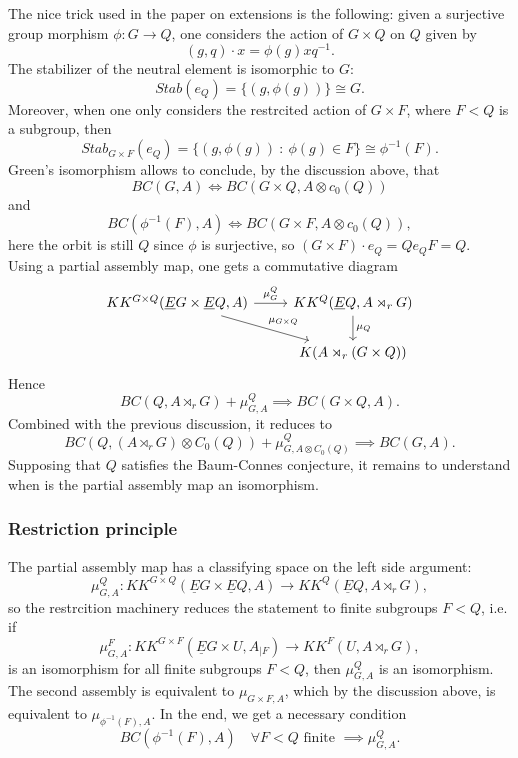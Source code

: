 The nice trick used in the paper on extensions is the following: given a surjective group morphism $\phi: G \rightarrow Q$, one considers the action of $G\times Q$ on $Q$ given by 
\[(g,q)\cdot x  =  \phi(g)xq^{-1}.\]
The stabilizer of the neutral element is isomorphic to $G$:
\[Stab(e_Q) = \{ (g,\phi(g)) \}\cong G .\]
Moreover, when one only considers the restrcited action of $G\times F$, where $F<Q$ is a subgroup, then
\[Stab_{G\times F}(e_Q) =\{ (g,\phi(g))\ : \ \phi(g)\in F \}\cong \phi^{-1}(F).\]
Green's isomorphism allows to conclude, by the discussion above, that 
\[BC(G,A) \iff BC(G\times Q , A\otimes c_0(Q))\]
and 
\[BC(\phi^{-1}(F),A) \iff BC(G\times F , A\otimes c_0(Q)),\]
here the orbit is still $Q$ since $\phi$ is surjective, so $(G\times F)\cdot e_Q = Qe_Q F=Q$.\\

Using a partial assembly map, one gets a  commutative diagram
\[\begin{tikzcd}
KK^{G\times Q}(\underline E G \times \underline E Q, A) \arrow{rd}{\mu_{G\times Q}}\arrow{r}{\mu_G^Q} & KK^Q(\underline E Q , A\rtimes_r G) \arrow{d}{\mu_Q} \\
		& K(A\rtimes_r (G\times Q) )
\end{tikzcd}\]
Hence 
\[BC(Q, A\rtimes_r G) + \mu_{G,A}^Q \implies BC(G\times Q , A).\]
Combined with the previous discussion, it reduces to 
\[BC(Q, (A\rtimes_r G)\otimes C_0(Q)) + \mu_{G,A\otimes C_0(Q)}^Q \implies BC(G , A).\]
Supposing that $Q$ satisfies the Baum-Connes conjecture, it remains to understand when is the partial assembly map an isomorphism.

\subsubsection{Restriction principle}

The partial assembly map has a classifying space on the left side argument:
\[\mu_{G,A}^Q : KK^{G\times Q}(\underline E G \times \underline E Q, A) \rightarrow KK^Q(\underline E Q , A\rtimes_r G),\]
so the restrcition machinery reduces the statement to finite subgroups $F< Q$, i.e. if
\[\mu_{G,A}^F : KK^{G\times F}(\underline E G \times U, A_{|F}) \rightarrow KK^F(U , A\rtimes_r G),\]
is an isomorphism for all finite subgroups $F<Q$, then $\mu_{G,A}^Q$ is an isomorphism. The second assembly is equivalent to $\mu_{G\times F, A}$, which by the discussion above, is equivalent to $\mu_{\phi^{-1}(F),A}$. In the end, we get a necessary condition 
\[BC(\phi^{-1}(F) ,A)\quad \forall F< Q \text{ finite } \implies \mu_{G,A}^Q.\]

